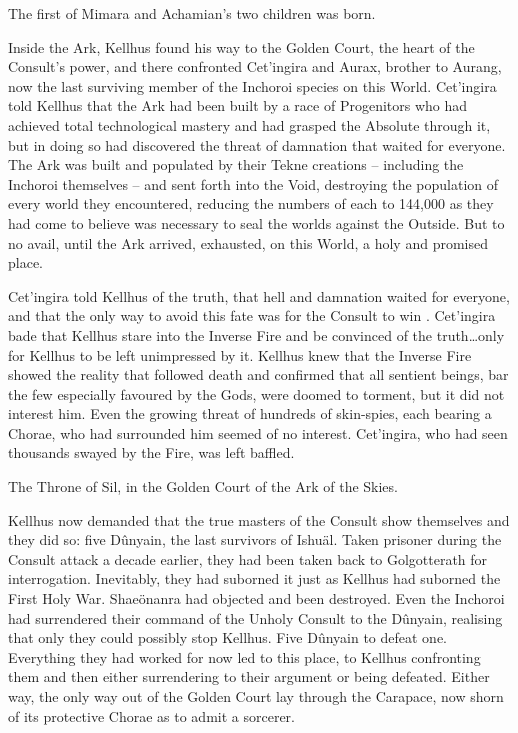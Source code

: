 \documentclass[]{book}
\begin{document}
The first of Mimara and Achamian's two children was born.

Inside the Ark, Kellhus found his way to the Golden Court, the heart of the Consult's
power, and there confronted Cet'ingira and Aurax, brother to Aurang, now the last
surviving member of the Inchoroi species on this World. Cet'ingira told Kellhus that
the Ark had been built by a race of Progenitors who had achieved total technological
mastery and had grasped the Absolute through it, but in doing so had discovered the
threat of damnation that waited for everyone. The Ark was built and populated by their
Tekne creations -- including the Inchoroi themselves -- and sent forth into the Void,
destroying the population of every world they encountered, reducing the numbers of
each to 144,000 as they had come to believe was necessary to seal the worlds against the
Outside. But to no avail, until the Ark arrived, exhausted, on this World, a holy and
promised place.

Cet'ingira told Kellhus of the truth, that hell and damnation waited for everyone, and
that the only way to avoid this fate was for the Consult to win . Cet'ingira bade that
Kellhus stare into the Inverse Fire and be convinced of the truth\ldots{}only for Kellhus to
be left unimpressed by it. Kellhus knew that the Inverse Fire showed the reality that
followed death and confirmed that all sentient beings, bar the few especially favoured
by the Gods, were doomed to torment, but it did not interest him. Even the growing
threat of hundreds of skin-spies, each bearing a Chorae, who had surrounded him
seemed of no interest. Cet'ingira, who had seen thousands swayed by the Fire, was left
baffled.

The Throne of Sil, in the Golden Court of the Ark of the Skies.

Kellhus now demanded that the true masters of the Consult show themselves and they
did so: five Dûnyain, the last survivors of Ishuäl. Taken prisoner during the Consult
attack a decade earlier, they had been taken back to Golgotterath for interrogation.
Inevitably, they had suborned it just as Kellhus had suborned the First Holy War.
Shaeönanra had objected and been destroyed. Even the Inchoroi had surrendered their
command of the Unholy Consult to the Dûnyain, realising that only they could
possibly stop Kellhus. Five Dûnyain to defeat one. Everything they had worked for now
led to this place, to Kellhus confronting them and then either surrendering to their
argument or being defeated. Either way, the only way out of the Golden Court lay
through the Carapace, now shorn of its protective Chorae as to admit a sorcerer.
\end{document}
